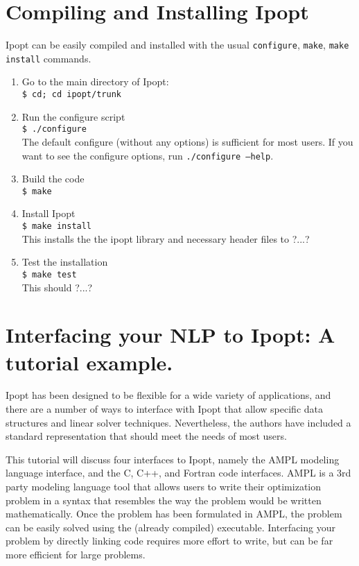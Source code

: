 \documentclass[letter,10pt]{article}
\begin{document}
\section{Compiling and Installing Ipopt} \label{sec.comp_and_inst}
Ipopt can be easily compiled and installed with the usual {\tt configure},
{\tt make}, {\tt make install} commands.
\begin{enumerate}
\item{Go to the main directory of Ipopt:\\
{\tt \$ cd; cd ipopt/trunk}}
\item{Run the configure script}\\
{\tt \$ ./configure}\\ 
The default configure (without any options) is
sufficient for most users. If you want to see the configure options,
run {\tt ./configure --help}.
\item{Build the code}\\
{\tt \$ make}
\item{Install Ipopt}\\
{\tt \$ make install}\\ 
This installs the the ipopt library and
necessary header files to ?...?
\item{Test the installation}\\
{\tt \$ make test}\\
This should ?...?
\end{enumerate}

\section{Interfacing your NLP to Ipopt: A tutorial example.}
Ipopt has been designed to be flexible for a wide variety of
applications, and there are a number of ways to interface with Ipopt
that allow specific data structures and linear solver
techniques. Nevertheless, the authors have included a standard
representation that should meet the needs of most users.

This tutorial will discuss four interfaces to Ipopt, namely the AMPL
modeling language interface, and the C, C++, and Fortran code
interfaces.  AMPL is a 3rd party modeling language tool that allows
users to write their optimization problem in a syntax that resembles
the way the problem would be written mathematically. Once the problem
has been formulated in AMPL, the problem can be easily solved using
the (already compiled) executable. Interfacing your problem by
directly linking code requires more effort to write, but can be far
more efficient for large problems.
\end{document}
